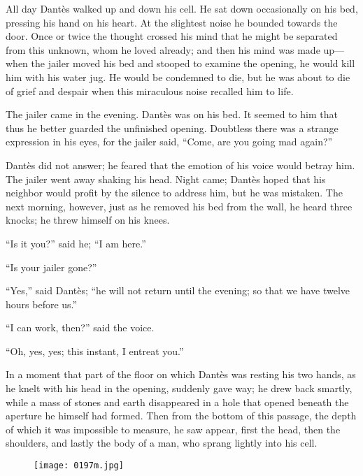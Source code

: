 All day Dantès walked up and down his cell. He sat down occasionally on
his bed, pressing his hand on his heart. At the slightest noise he
bounded towards the door. Once or twice the thought crossed his mind
that he might be separated from this unknown, whom he loved already;
and then his mind was made up—when the jailer moved his bed and stooped
to examine the opening, he would kill him with his water jug. He would
be condemned to die, but he was about to die of grief and despair when
this miraculous noise recalled him to life.

The jailer came in the evening. Dantès was on his bed. It seemed to him
that thus he better guarded the unfinished opening. Doubtless there was
a strange expression in his eyes, for the jailer said, “Come, are you
going mad again?”

Dantès did not answer; he feared that the emotion of his voice would
betray him. The jailer went away shaking his head. Night came; Dantès
hoped that his neighbor would profit by the silence to address him, but
he was mistaken. The next morning, however, just as he removed his bed
from the wall, he heard three knocks; he threw himself on his knees.

“Is it you?” said he; “I am here.”

“Is your jailer gone?”

“Yes,” said Dantès; “he will not return until the evening; so that we
have twelve hours before us.”

“I can work, then?” said the voice.

“Oh, yes, yes; this instant, I entreat you.”

In a moment that part of the floor on which Dantès was resting his two
hands, as he knelt with his head in the opening, suddenly gave way; he
drew back smartly, while a mass of stones and earth disappeared in a
hole that opened beneath the aperture he himself had formed. Then from
the bottom of this passage, the depth of which it was impossible to
measure, he saw appear, first the head, then the shoulders, and lastly
the body of a man, who sprang lightly into his cell.

\begin{figure}[h]
\texttt{[image: 0197m.jpg]}
\end{figure}
